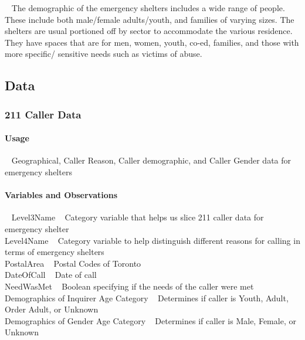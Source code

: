 \documentclass[
]{article}
\begin{document}
~ The demographic of the emergency shelters includes a wide range of
people. These include both male/female adults/youth, and families of
varying sizes. The shelters are usual portioned off by sector to
accommodate the various residence. They have spaces that are for men,
women, youth, co-ed, families, and those with more specific/ sensitive
needs such as victims of abuse.

\hypertarget{data}{%
\subsection{Data}\label{data}}

\hypertarget{caller-data}{%
\subsubsection{211 Caller Data}\label{caller-data}}

\hypertarget{usage}{%
\paragraph{Usage}\label{usage}}

~ Geographical, Caller Reason, Caller demographic, and Caller Gender
data for emergency shelters

\hypertarget{variables-and-observations}{%
\paragraph{Variables and
Observations}\label{variables-and-observations}}

~ Level3Name ~ Category variable that helps us slice 211 caller data for
emergency shelter\\
\hspace*{0.333em} Level4Name ~ Category variable to help distinguish
different reasons for calling in terms of emergency shelters\\
\hspace*{0.333em} PostalArea ~ Postal Codes of Toronto\\
\hspace*{0.333em} DateOfCall ~ Date of call\\
\hspace*{0.333em} NeedWasMet ~ Boolean specifying if the needs of the
caller were met\\
\hspace*{0.333em} Demographics of Inquirer Age Category ~ Determines if
caller is Youth, Adult, Order Adult, or Unknown\\
\hspace*{0.333em} Demographics of Gender Age Category ~ Determines if
caller is Male, Female, or Unknown
\end{document}
